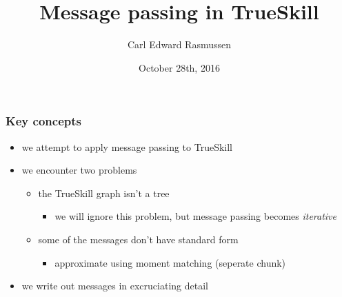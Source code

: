 

\title{Message passing in TrueSkill}
\author{Carl Edward Rasmussen}
\date{October 28th, 2016}




\begin{frame}
\titlepage
\end{frame}


\begin{frame}
\frametitle{Key concepts}

\begin{itemize}
\item we attempt to apply message passing to TrueSkill
\item we encounter two problems
\begin{itemize}
\item the TrueSkill graph isn't a tree
\begin{itemize}
\item we will ignore this problem, but message passing becomes \emph{iterative}
\end{itemize}
\item some of the messages don't have standard form
\begin{itemize}
\item approximate using moment matching (seperate chunk)
\end{itemize}
\end{itemize}
\item we write out messages in excruciating detail
\end{itemize}

\end{frame}


